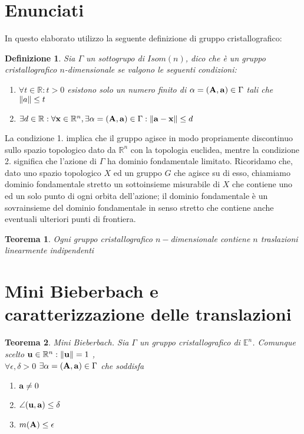 \documentclass[a4paper,11pt,openright,twoside	]{book}
\newtheorem{definition}{Definizione}[section]
\newtheorem{theorem}{Teorema}[section]
\begin{document}
\section{Enunciati}
In questo elaborato utilizzo la seguente definizione di gruppo cristallografico:
\begin{definition}
Sia $\Gamma$ un sottogrupo di $Isom(n)$, dico che è un gruppo cristallografico $n$-dimensionale se valgono le seguenti condizioni:
\begin{enumerate}
	\item $ \forall t \in \mathbb{R} : t > 0 $  esistono solo un numero finito di $\alpha = \vb{(A, a)} \in \Gamma $  tali che  $\norm{a} \leq t$ 
	\item $ \exists d \in \mathbb{R}: \forall \vb{x} \in \mathbb{R}^n ,  \exists \alpha = \vb{(A,a)} \in \Gamma : \norm{\vb{a-x}}\leq d $
\end{enumerate}
\end{definition}
La condizione 1. implica che il gruppo agisce in modo propriamente discontinuo sullo spazio topologico dato da $\mathbb{R}^n$ con la topologia euclidea, mentre la condizione 2. significa che l'azione di $\Gamma$ ha dominio fondamentale limitato. Ricoridamo che, dato uno spazio topologico $X$ ed un gruppo $G$ che agisce su di esso, chiamiamo dominio fondamentale stretto un sottoinsieme misurabile di $X$ che contiene uno ed un solo punto di ogni orbita dell'azione; il dominio fondamentale è un sovrainsieme del dominio fondamentale in senso stretto che contiene anche eventuali ulteriori punti di frontiera. \\
\begin{theorem}
Ogni gruppo cristallografico $n-$dimensionale contiene $n$ traslazioni linearmente indipendenti
\end{theorem}
\newpage 
\section{Mini Bieberbach e caratterizzazione delle translazioni} 
\begin{theorem}{Mini Bieberbach.} 
\label{teo:minibieb}
Sia $\Gamma$ un gruppo cristallografico di $\mathbb{E}^n$. Comunque scelto $ \vb{u} \in \mathbb{R}^n : \norm{\vb{u}} = 1$ ,\\
$  \forall \epsilon ,\delta >0 $ $   \exists \alpha = \vb{(A,a)} \in \Gamma $ che soddisfa 
\begin{enumerate}
\item $\vb{a} \neq 0$ 
\item $ \angle (\vb{u, a}) \leq \delta $
\item $ m(\vb{A}) \leq \epsilon$ 
\end{enumerate}
\end{theorem}
\end{document}
